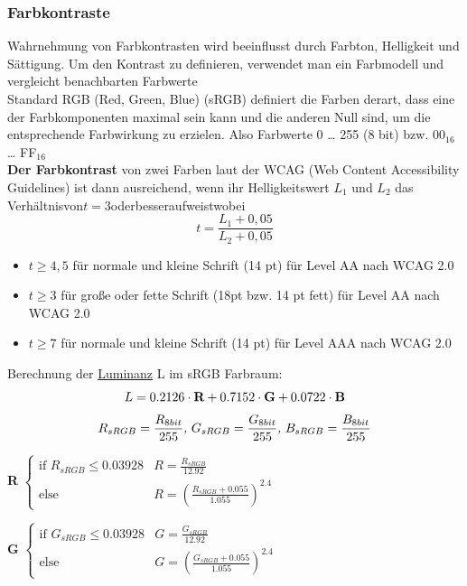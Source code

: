 \documentclass[12pt,landscape]{article}
\begin{document}
\begin{multicols}{3}
\subsubsection{Farbkontraste}
Wahrnehmung von Farbkontrasten wird beeinflusst durch Farbton, Helligkeit und Sättigung. Um den Kontrast zu definieren, verwendet man ein Farbmodell und vergleicht benachbarten Farbwerte\\
Standard RGB (Red, Green, Blue) (sRGB) definiert die Farben derart, dass eine der Farbkomponenten maximal sein 
kann und die anderen Null sind, um die entsprechende Farbwirkung zu erzielen. Also Farbwerte 0 … 255 (8 bit) bzw. $00_{16}$ … FF$_{16}$\\
\textbf{Der Farbkontrast} von zwei Farben laut der WCAG (Web Content Accessibility Guidelines) ist dann ausreichend, wenn ihr Helligkeitswert $L_1$ und $L_2$ das Verhältnis\hfill von\hfill $t=3$\hfill oder\hfill besser\hfill aufweist\hfill wobei\newline
\[t=\frac{L_1+0,05}{L_2+0,05}\]
\begin{itemize}
\item $t\geq4,5$ für normale und kleine Schrift (14 pt) für Level AA nach WCAG 2.0
\item $t\geq3$  für große oder fette Schrift (18pt bzw. 14 pt fett) für Level AA nach 
WCAG 2.0
\item $t\geq7$ für normale und kleine Schrift (14 pt) für Level AAA nach WCAG 2.0
\end{itemize}
Berechnung der \href{https://webaim.org/resources/contrastchecker/}{Luminanz} L im sRGB Farbraum:
\begin{equation*}
    L = 0.2126 \cdot \textbf{R} + 0.7152 \cdot \textbf{G} + 0.0722 \cdot \textbf{B} \newline
\end{equation*}
\begin{equation*}\small
     R_{sRGB} = \frac{R_{8bit}}{255} \textit{,   } G_{sRGB} = \frac{G_{8bit}}{255} \textit{,   } B_{sRGB} = \frac{B_{8bit}}{255}
\end{equation*}

\textbf{R} \colonequals
$\begin{cases}
 \text{if } R_{sRGB} \leq 0.03928 & R = \frac{R_{sRGB}}{12.92} \\
 \text{else } & R=(\frac{R_{sRGB}+0.055}{1.055}) ^ {2.4}
\end{cases}$

\textbf{G} \colonequals
$\begin{cases}
 \text{if } G_{sRGB} \leq 0.03928 & G = \frac{G_{sRGB}}{12.92} \\
 \text{else } & G=(\frac{G_{sRGB}+0.055}{1.055}) ^ {2.4}
\end{cases}$


\end{multicols}
\end{document}
